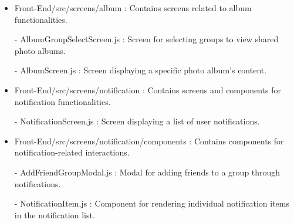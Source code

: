 \begin{itemize}
                    \item Front-End/src/screens/album : Contains screens related to album functionalities.
                        \item[-] AlbumGroupSelectScreen.js : Screen for selecting groups to view shared photo albums.
                        \item[-] AlbumScreen.js : Screen displaying a specific photo album's content.
                    \vspace{3mm}
                    
                    \item Front-End/src/screens/notification : Contains screens and components for notification functionalities.
                        \item[-] NotificationScreen.js : Screen displaying a list of user notifications.
                    \vspace{3mm}
                    
                    \item Front-End/src/screens/notification/components : Contains components for notification-related interactions.
                        \item[-] AddFriendGroupModal.js : Modal for adding friends to a group through notifications.
                        \item[-] NotificationItem.js : Component for rendering individual notification items in the notification list.
                    \vspace{3mm}

                  
                    

\end{itemize}

